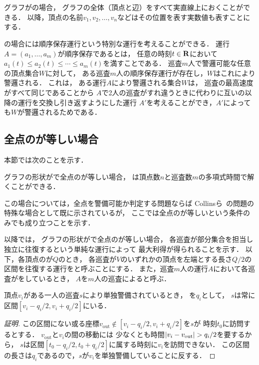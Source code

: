 \section{{\graphLine}}
\label{section: line}

グラフが{\graphLine}の場合，
グラフの全体（頂点と辺）をすべて実直線上におくことができる．
以降，頂点の名前$v_1, v_2, \ldots, v_n$などはその位置を表す実数値も表すことにする．

{\graphLine}の場合には順序保存運行という特別な運行を考えることができる．
運行$A = (a_1, \ldots, a_m)$が順序保存であるとは，
任意の時刻$t \in \mathbf R$において
$a_1(t) \leq a_2(t) \leq \cdots \leq a_m(t)$を満すことである．
巡査$m$人で警邏可能な任意の頂点集合$W$に対して，
ある巡査$m$人の順序保存運行が存在し，$W$はこれにより警邏される．
これは，
ある運行$A$により警邏される集合$W$は，
巡査の最高速度がすべて同じであることから
$A$で2人の巡査がすれ違うときに代わりに互いの以降の運行を交換し引き返すようにした運行
$A'$を考えることができ，$A'$によっても$W$が警邏されるためである．



\subsection{全点の{\maxIdletime}が等しい場合}
\label{subsec:LineUnaryTimelimit}


本節では次のことを示す．

\begin{theo}
\label{theo:LineEqualTimelimit}
グラフの形状が{\graphLine}で全点の{\maxIdletime}が等しい場合，
{\patProb}は頂点数$n$と巡査数$m$の多項式時間で解くことができる．
\end{theo}

この場合については，全点を警備可能か判定する問題ならば
Collinsら~\cite{collins2013optimal}の問題の特殊な場合として既に示されているが，
ここでは全点の{\maxIdletime}が等しいという条件のみでも成り立つことを示す．

以降では，
グラフの形状が{\graphLine}で全点の{\maxIdletime}が等しい場合，
各巡査が部分集合を担当し独立に往復するという単純な運行によって
最大利得が得られることを示す．
以下，各頂点の{\maxIdletime}が$Q$のとき，
各巡査が$V$のいずれかの頂点を左端とする長さ$Q/2$の区間を往復する運行を{\indSectOperation}と呼ぶことにする．
また，巡査$m$人の運行$A$において各巡査が{\indSectOperation}をしているとき，
$A$を$m$人の巡査による{\indSectOperation}と呼ぶ．


\begin{lemm}
  \label{lemm:RangeOfPatrollerOnLine}
  頂点$v_i$がある一人の巡査$s$により単独警備されているとき，
  {\maxIdletime}を$q_i$として，
  $s$は常に区間$[v_i - q_i/2, v_i + q_i/2]$にいる．
\end{lemm}
\begin{proof}[証明]
  \newcommand{\vout}{v_{\mathrm{out}}}
  この区間にない或る座標$\vout \notin [v_i - q_i/2, v_i + q_i/2]$を$s$が
  時刻$t_0$に訪問するとする．
  $\vout$と$v_i$の間の移動には
  少なくとも時間$\abs{v_i - \vout} > q _i / 2$を要するから，
  $s$は区間$[t_0 - q _i / 2, t_0 + q _i / 2]$に属する時刻に$v_i$を訪問できない．
  この区間の長さは$
    q_i
  $であるので，$s$が$v _i$を単独警備していることに反する．
\end{proof}


